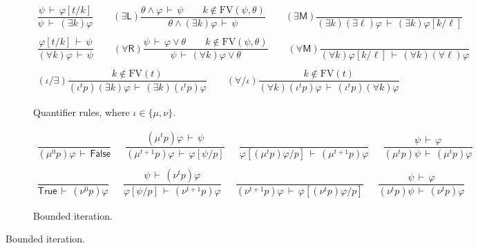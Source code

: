 \documentclass[%
  a4paper,
  UKenglish,
  cleveref,
  autoref,
  thm-restate,
  numberwithinsect,
]{lipics-v2021}
\newcommand\thesis{\vdash}
\newcommand\ax[1]{(\mathsf{#1})}
\newcommand\temp[1]{\mathsf{#1}}
\newcommand\True{\temp{True}}
\newcommand\False{\temp{False}}
\newcommand\FV{\mathrm{FV}}
\newcommand\itvar{k}
\newcommand\itvarbis{\ell}
\newcommand\FP{p}
\newcommand\finmu{\mu}
\newcommand\finnu{\nu}
\newcommand\fingen{\iota}
\begin{document}
\begin{figure}[p!]
\begin{subfigure}{\textwidth}
\centering
\(
\begin{array}{c}
%
\dfrac{\psi \,\thesis\, \varphi[t / \itvar]}
  {\psi \,\thesis\ (\exists \itvar)\varphi}
%
\qquad
%
\ax{\exists L}
\dfrac{\theta \land \varphi \,\thesis\, \psi
  \qquad
  \itvar \notin \FV(\psi, \theta)}
  {\theta \land (\exists \itvar)\varphi \,\thesis\, \psi}
%
\qquad
%
\ax{\exists M}
\dfrac{}
  {(\exists \itvar)(\exists \itvarbis)\varphi
  \,\thesis\,
  (\exists \itvar)\varphi[\itvar / \itvarbis]}
%
\\\\
%
\dfrac{\varphi[t / \itvar] \,\thesis\, \psi}
  {(\forall \itvar)\varphi \,\thesis\, \psi}
%
\qquad
%
\ax{\forall R}
\dfrac{\psi \,\thesis\, \varphi \lor \theta
  \qquad
  \itvar \notin \FV(\psi, \theta)}
  {\psi \,\thesis\, (\forall \itvar)\varphi \lor \theta}
%
\qquad
%
\ax{\forall M}
\dfrac{}
  {(\forall \itvar)\varphi[\itvar / \itvarbis]
  \,\thesis\,
  (\forall \itvar)(\forall \itvarbis)\varphi}
%
\\\\
%
\ax{\fingen/\exists}
\dfrac{\itvar \notin \FV(t)}
  {(\fingen^t \FP)(\exists \itvar)\varphi
  \,\thesis\,
  (\exists \itvar)(\fingen^t \FP)\varphi}
%
\qquad
%
\ax{\forall/\fingen}
\dfrac{\itvar \notin \FV(t)}
  {(\forall \itvar)(\fingen^t \FP)\varphi
  \,\thesis\,
  (\fingen^t \FP)(\forall \itvar)\varphi}
%
\end{array}
\)
\caption{Quantifier rules,
where $\fingen \in \{\finmu, \finnu\}$.%
\label{fig:ded:quant}}
\end{subfigure}


\begin{subfigure}{\textwidth}
\centering
\(
\begin{array}{c}
%
\dfrac{}
  {(\finmu^0 \FP)\varphi \,\thesis\, \False}
%
\quad~~
%
\dfrac{(\finmu^t \FP)\varphi \,\thesis\, \psi}
  {(\finmu^{t+1} \FP)\varphi \,\thesis\, \varphi[\psi / \FP]}
%
\quad~~
%
\dfrac{}
  {\varphi[(\finmu^t \FP)\varphi / \FP] \,\thesis\, (\finmu^{t+1} \FP)\varphi}
%
\quad~~
%
\dfrac{\psi \,\thesis\, \varphi}
  {(\finmu^t \FP)\psi \,\thesis\, (\finmu^t \FP)\varphi}
%
\\\\
%
\dfrac{}
  {\True \,\thesis\, (\finnu^0 \FP)\varphi}
%
\quad~~
%
\dfrac{\psi \,\thesis\, (\finnu^t \FP)\varphi}
  {\varphi[\psi / \FP] \,\thesis\, (\finnu^{t+1} \FP)\varphi}
%
\quad~~
%
\dfrac{}
  {(\finnu^{t+1} \FP)\varphi \,\thesis\, \varphi[(\finnu^t \FP)\varphi / \FP]}
%
\quad~~
%
\dfrac{\psi \,\thesis\, \varphi}
  {(\finnu^t \FP)\psi \,\thesis\, (\finnu^t \FP)\varphi}
%
\end{array}
\)
\caption{Bounded iteration.%
\label{fig:ded:iter}}
\end{subfigure}


\end{figure}
\end{document}

